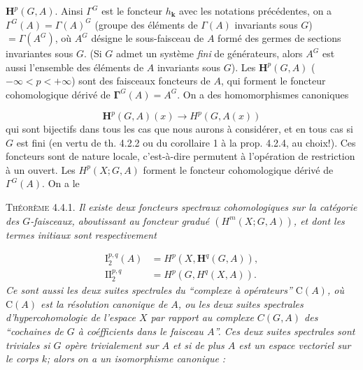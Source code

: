 \clearpage
{}

$\mathbf H^p(G,A)$. Ainsi $\Gamma^G$ est le foncteur $h_{\mathbf k}$ avec les notations
précédentes, on a
$\Gamma^G(A)=\Gamma(A)^G$ (groupe des éléments de $\Gamma(A)$ invariants sous
$G$) $=\Gamma(A^G)$, où $A^G$ désigne le sous-faisceau de $A$ formé des germes
de sections invariantes sous $G$. (Si $G$ admet un système \textit{fini} de
générateurs, alors $A^G$ est aussi l'ensemble des éléments de $A$ invariants
sous $G$).
Les $\mathbf H^p(G,A)$ ($-\infty<p<+\infty$) sont des faisceaux foncteurs de
$A$, qui forment le foncteur cohomologique dérivé de
$\boldsymbol{\Gamma}^G(A)=A^G$. On a des homomorphismes canoniques

\[
\mathbf H^p(G,A)(x)\to H^p(G,A(x))
\]
qui sont bijectifs dans tous les cas que nous aurons à considérer, et en tous
cas si $G$ est fini (en vertu de th. 4.2.2 ou du corollaire 1 à la prop. 4.2.4,
au choix!). Ces foncteurs sont de nature locale, c'est-à-dire permutent à
l'opération de restriction à un ouvert.
Les $H^p(X;G,A)$ forment le foncteur cohomologique dérivé de $\Gamma^G(A)$.
On a le

\textsc{Théorème 4.4.1.} \textit{Il existe deux foncteurs spectraux
cohomologiques sur la catégorie des $G$-faisceaux, aboutissant au foncteur
gradué $(H^m(X;G,A))$, et dont les termes initiaux sont respectivement}

\[
\tag{4.4.1}
\begin{aligned}
\mathrm I_2^{p,q}(A)&=H^p(X,\mathbf H^q(G,A)),\\
\mathrm {II}_2^{p,q}&=H^p(G,H^q(X,A)).
\end{aligned}
\]
\textit{Ce sont aussi les deux suites spectrales du \textup{``}complexe à opérateurs\textup{''}
$\mathrm C(A)$, où $\mathrm C(A)$ est la résolution canonique de $A$, ou les deux suites
spectrales d'hypercohomologie de l'espace $X$ par rapport au complexe
$C(G,A)$ des \textup{``}cochaines de $G$ à coéfficients dans le faisceau $A$\textup{''}. Ces
deux suites spectrales sont triviales si $G$ opère trivialement sur $A$ et si
de plus $A$ est un espace vectoriel sur le corps $k$; alors on a un
isomorphisme canonique :}

